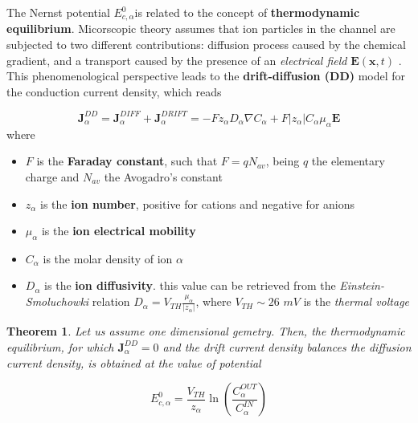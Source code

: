 \documentclass[12pt, a4paper]{report}
\newtheorem{theorem}{Theorem}[section]
\begin{document}
The Nernst potential $E_{c,\alpha}^0$is related to the concept of  \textbf{thermodynamic equilibrium}. Micorscopic theory assumes that ion particles in the channel are subjected to two different contributions: diffusion process caused by the chemical gradient, and a transport caused by the presence of an \textit{electrical field} $\textbf{E}(\textbf{x},t)$ \cite{35}.%
 This phenomenological perspective leads to the \textbf{drift-diffusion (DD)} model for the conduction current density, which reads

\begin{equation}
\textbf{J}_{\alpha}^{DD} = \textbf{J}_{\alpha}^{DIFF} + \textbf{J}_{\alpha}^{DRIFT} = -Fz_{\alpha}D_{\alpha}\nabla C_{\alpha} + F|z_{\alpha}| C_{\alpha}\mu_{\alpha}\textbf{E}
\label{DD}
\end{equation}
where 
\begin{itemize}
	
	\item $F$ is the \textbf{Faraday constant}, such that $F = q N_{av}$, being $q$ the elementary charge and $N_{av}$ the Avogadro's constant
	
	\item $z_{\alpha}$ is the \textbf{ion number}, positive for cations and negative for anions
	
	\item $\mu_{\alpha}$ is the \textbf{ion electrical mobility}
	
	\item $C_{\alpha}$ is the molar density of ion $\alpha$
	
	\item $D_{\alpha}$ is the \textbf{ion diffusivity}. this value can be retrieved from the \textit{Einstein-Smoluchowki} relation \cite{36} %
	 $D_{\alpha} = V_{TH}\frac{\mu_{\alpha}}{|z_{\alpha}|}$, where $ V_{TH} \sim 26$ $mV$ is the \textit{thermal voltage}
\end{itemize}

\begin{theorem}
	Let us assume one dimensional gemetry. Then, the thermodynamic equilibrium, for which $\textbf{J}_{\alpha}^{DD} = 0$ and  the drift current density balances the diffusion current density, is obtained at the value of potential
	
	\begin{equation}
	E_{c,\alpha}^0 = \frac{V_{TH}}{z_{\alpha}}\ln\left(\frac{C_{\alpha}^{OUT}}{C_{\alpha}^{IN}}\right)
	\end{equation}	
	
	
\end{theorem}
\end{document}
